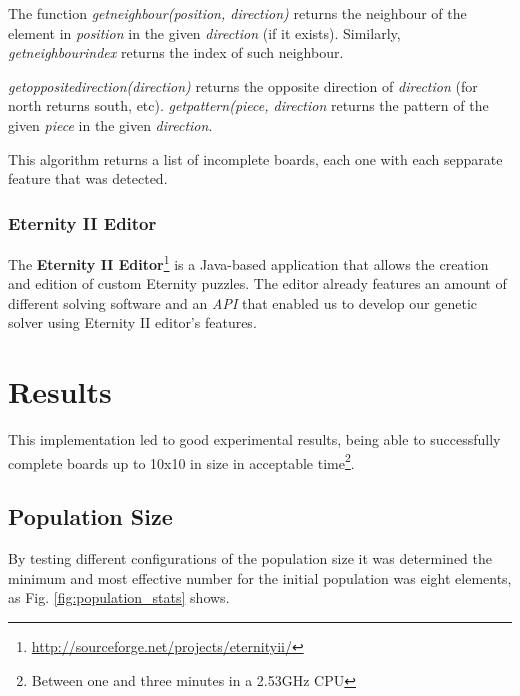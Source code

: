 \documentclass{llncs}
\begin{document}
The function \textit{getneighbour(position, direction)} returns the neighbour of the element in \textit{position} in the given \textit{direction} (if it exists). Similarly, \textit{getneighbourindex} returns the index of such neighbour.

\textit{getoppositedirection(direction)} returns the opposite direction of \textit{direction} (for north returns south, etc). \textit{getpattern(piece, direction} returns the pattern of the given \textit{piece} in the given \textit{direction}.

This algorithm returns a list of incomplete boards, each one with each sepparate feature that was detected.

\subsubsection{Eternity II Editor}\label{sec:eternity2_editor}

The \textbf{Eternity II Editor}\footnote{\url{http://sourceforge.net/projects/eternityii/}} is a Java-based application that allows the creation and edition of custom Eternity puzzles. The editor already features an amount of different solving software and an \textit{API} that enabled us to develop our genetic solver using Eternity II editor's features.

\section{Results}\label{sec:results}

This implementation led to good experimental results, being able to successfully complete boards up to 10x10 in size in acceptable time\footnote{Between one and three minutes in a 2.53GHz CPU}.

\subsection{Population Size}\label{sec:population_size}

By testing different configurations of the population size it was determined the minimum and most effective number for the initial population was eight elements, as Fig. \ref{fig:population_stats} shows.
\end{document}
